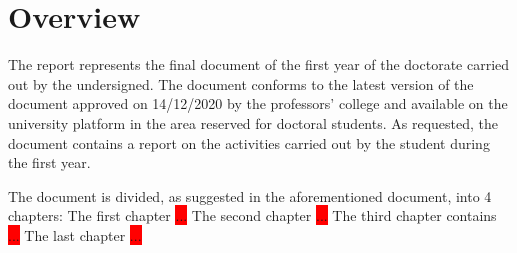\clearpage
\chapter*{Overview}\label{chapter:overview}

The report represents the final document of the first year of the doctorate carried out by the undersigned. The document conforms to the latest version of the document \hyperlink{https://corsi.unisa.it/ingegneria-dell-informazione/didattica/guida-dello-studente}{\textit{}} approved on 14/12/2020 by the professors' college and available on the university platform in the area reserved for doctoral students. As requested, the document contains a report on the activities carried out by the student during the first year. \par
The document is divided, as suggested in the aforementioned document, into 4 chapters: 
\newline The first chapter \colorbox{red}{...} 
\newline The second chapter \colorbox{red}{...} 
\newline The third chapter contains \colorbox{red}{...}
\newline The last chapter \colorbox{red}{...}

